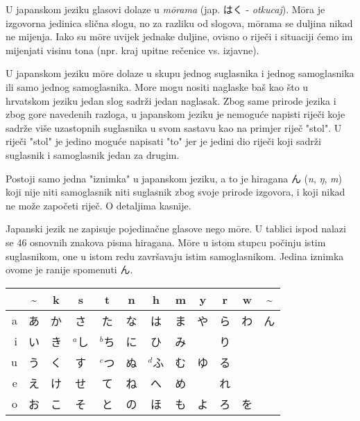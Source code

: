 
\author{Tomislav Mamić}

	
	
	U japanskom jeziku glasovi dolaze u \textit{m\={o}rama} (jap. はく - \textit{otkucaj}). M\={o}ra je izgovorna jedinica slična slogu, no za razliku od slogova, m\={o}rama se duljina nikad ne mijenja. Iako su m\={o}re uvijek jednake duljine, ovisno o riječi i situaciji ćemo im mijenjati visinu tona (npr. kraj upitne rečenice vs. izjavne).
	
	U japanskom jeziku m\={o}re dolaze u skupu jednog suglasnika i jednog samoglasnika ili samo jednog samoglasnika. More mogu nositi naglaske baš kao što u hrvatskom jeziku jedan slog sadrži jedan naglasak. Zbog same prirode jezika i zbog gore navedenih razloga, u japanskom jeziku je nemoguće napisti riječi koje sadrže više uzastopnih suglasnika u svom sastavu kao na primjer riječ "stol". U riječi "stol" je jedino moguće napisati "to" jer je jedini dio riječi koji sadrži suglasnik i samoglasnik jedan za drugim.
	
	Postoji samo jedna "iznimka" u japanskom jeziku, a to je hiragana ん (\textit{n}, \textit{ŋ}, \textit{m}) koji nije niti samoglasnik niti suglasnik zbog svoje prirode izgovora, i koji nikad ne može započeti riječ.
	O detaljima kasnije.
	
	
	
	Japanski jezik ne zapisuje pojedinačne glasove nego m\={o}re. U tablici ispod nalazi se 46 osnovnih znakova pisma hiragana. M\={o}re u istom stupcu počinju istim suglasnikom, one u istom redu završavaju istim samoglasnikom. Jedina iznimka ovome je ranije spomenuti ん.
	
	\setlength{\tabcolsep}{10pt}
	\vspace{10pt}
	\begin{tabular}{|r|c|c|c|c|c|c|c|c|c|c|c|}
		\hline
		&\textasciitilde&k&s&t&n&h&m&y&r&w&\textasciitilde\\
		\hline
		a&あ&か&さ&た&な&は&ま&や&ら&わ&ん\\
		i&い&き&$^a$し&$^b$ち&に&ひ&み&&り&&\\
		u&う&く&す&$^c$つ&ぬ&$^d$ふ&む&ゆ&る&&\\
		e&え&け&せ&て&ね&へ&め&&れ&&\\
		o&お&こ&そ&と&の&ほ&も&よ&ろ&を&\\
		\hline
	\end{tabular}
	
